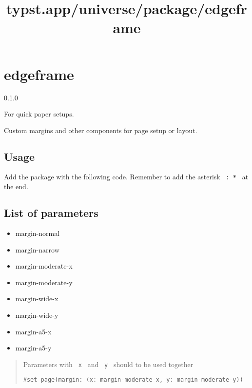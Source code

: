 \title{typst.app/universe/package/edgeframe}

\label{banner}
\section{edgeframe}\label{edgeframe}

{ 0.1.0 }

For quick paper setups.

\label{readme}
Custom margins and other components for page setup or layout.

\subsection{Usage}\label{usage}

Add the package with the following code. Remember to add the asterisk
\texttt{\ :\ *\ } at the end.

\begin{Shaded}
\begin{Highlighting}[]
\end{Highlighting}
\end{Shaded}

\begin{Shaded}
\begin{Highlighting}[]
\end{Highlighting}
\end{Shaded}

\subsection{List of parameters}\label{list-of-parameters}

\begin{itemize}
\tightlist
\item
  margin-normal
\item
  margin-narrow
\item
  margin-moderate-x
\item
  margin-moderate-y
\item
  margin-wide-x
\item
  margin-wide-y
\item
  margin-a5-x
\item
  margin-a5-y
\end{itemize}

\begin{quote}
Parameters with \texttt{\ x\ } and \texttt{\ y\ } should to be used
together

\begin{verbatim}
#set page(margin: (x: margin-moderate-x, y: margin-moderate-y))
\end{verbatim}
\end{quote}

